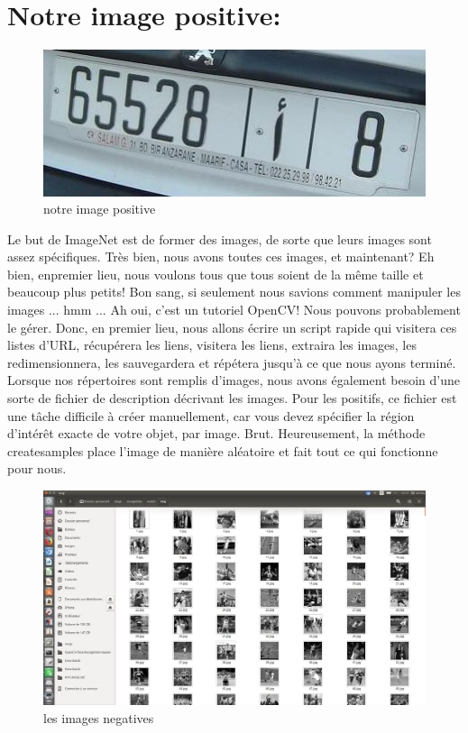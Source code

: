 \documentclass[11pt]{report}
\begin{document}
\section*{Notre image positive:}

\begin{figure}[H]
	\begin{center}
		\includegraphics[width=12cm]{images/matricule.png}
		\caption{notre image positive}
		\label{fig:figure}
	\end{center}
\end{figure}

Le but de ImageNet est de former des images, de sorte que leurs images sont assez
spécifiques. Très bien, nous avons toutes ces images, et maintenant? Eh bien, enpremier lieu, nous voulons tous que tous soient de la même taille et beaucoup plus
petits! Bon sang, si seulement nous savions comment manipuler les images ... hmm ...
Ah oui, c'est un tutoriel OpenCV! Nous pouvons probablement le gérer. Donc, en premier
lieu, nous allons écrire un script rapide qui visitera ces listes d’URL, récupérera les liens,
visitera les liens, extraira les images, les redimensionnera, les sauvegardera et répétera
jusqu’à ce que nous ayons terminé. Lorsque nos répertoires sont remplis d'images, nous
avons également besoin d'une sorte de fichier de description décrivant les images. Pour
les positifs, ce fichier est une tâche difficile à créer manuellement, car vous devez
spécifier la région d'intérêt exacte de votre objet, par image. Brut. Heureusement, la
méthode createsamples place l'image de manière aléatoire et fait tout ce qui fonctionne
pour nous.


\begin{figure}[H]
	\begin{center}
		\includegraphics[width=12cm]{images/negimg.png}
		\caption{les images negatives}
		\label{fig:figure}
	\end{center}
\end{figure}
\end{document}
